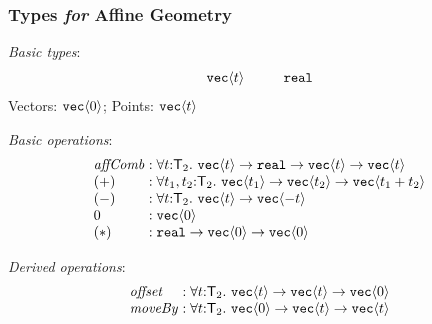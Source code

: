 \documentclass[xetex,serif,mathserif]{beamer}
\newcommand{\SynTransl}[1]{\mathsf{T}_#1}
\newcommand{\tyPrim}[2]{\textup{\texttt{#1}}\langle #2 \rangle}
\newcommand{\tyPrimNm}[1]{\textup{\texttt{#1}}}
\newenvironment{slide}[1]{\begin{frame}\frametitle{#1}}{\end{frame}}
\begin{document}
\begin{slide}{Types \emph{for} Affine Geometry}
  \textcolor{titlered}{\emph{Basic types}}:
  \begin{displaymath}
    \begin{array}{l@{\hspace{1cm}}l}
      \tyPrim{vec}{t} & \tyPrimNm{real}
    \end{array}
  \end{displaymath}
  \quad Vectors: $\tyPrim{vec}{0}$; Points: $\tyPrim{vec}{t}$

  \bigskip

  \textcolor{titlered}{\emph{Basic operations}}:
  \begin{displaymath}
    \begin{array}{l@{\hspace{0.3em}}l}
      \mathit{affComb} & : \forall t \mathord: \SynTransl{2}.~\tyPrim{vec}{t} \to \tyPrimNm{real} \to \tyPrim{vec}{t} \to \tyPrim{vec}{t} \\
      (+) & : \forall t_1,t_2 \mathord: \SynTransl{2}.~\tyPrim{vec}{t_1} \to \tyPrim{vec}{t_2} \to \tyPrim{vec}{t_1 + t_2} \\
      (-) & : \forall t \mathord: \SynTransl{2}.~\tyPrim{vec}{t} \to \tyPrim{vec}{-t} \\
      0   & : \tyPrim{vec}{0} \\
      (*) & : \tyPrimNm{real} \to \tyPrim{vec}{0} \to \tyPrim{vec}{0}
    \end{array}
  \end{displaymath}

  \textcolor{titlered}{\emph{Derived operations}}:
  \begin{displaymath}
    \begin{array}{l@{\hspace{0.3em}}l}
      \mathit{offset} & : \forall t \mathord: \SynTransl{2}.~\tyPrim{vec}{t} \to \tyPrim{vec}{t} \to \tyPrim{vec}{0} \\
      \mathit{moveBy} & : \forall t \mathord: \SynTransl{2}.~\tyPrim{vec}{0} \to \tyPrim{vec}{t} \to \tyPrim{vec}{t}
    \end{array}
  \end{displaymath}
\end{slide}
\end{document}
